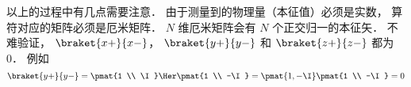 以上的过程中有几点需要注意． 由于测量到的物理量（本征值）必须是实数， 算符对应的矩阵必须是厄米矩阵． $N$ 维厄米矩阵会有 $N$ 个正交归一的本征矢． 不难验证， $\braket{x+}{x-}$， $\braket{y+}{y-}$ 和 $\braket{z+}{z-}$ 都为 0． 例如
\begin{equation}
\braket{y+}{y-} = \pmat{1 \\ \I}\Her \pmat{1 \\ -\I} = \pmat{1, -\I} \pmat{1 \\ -\I} = 0
\end{equation}

%
%
%

